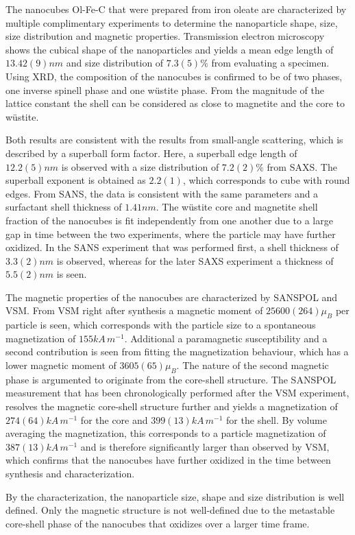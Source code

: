 \documentclass[\main/dresen_thesis.tex]{subfiles}
\begin{document}
  \label{sec:colloidalCrystals:nanoparticle:summary}
  The nanocubes Ol-Fe-C that were prepared from iron oleate are characterized by multiple complimentary experiments to determine the nanoparticle shape, size, size distribution and magnetic properties.
  Transmission electron microscopy shows the cubical shape of the nanoparticles and yields a mean edge length of $13.42(9) \unit{nm}$ and size distribution of $7.3(5) \%$ from evaluating a specimen.
  Using XRD, the composition of the nanocubes is confirmed to be of two phases, one inverse spinell phase and one w\"ustite phase.
  From the magnitude of the lattice constant the shell can be considered as close to magnetite and the core to w\"ustite.

  Both results are consistent with the results from small-angle scattering, which is described by a superball form factor.
  Here, a superball edge length of $12.2(5) \unit{nm}$ is observed with a size distribution of $7.2(2) \%$ from SAXS.
  The superball exponent is obtained as $2.2(1)$, which corresponds to cube with round edges.
  From SANS, the data is consistent with the same parameters and a surfactant shell thickness of $1.41 \unit{nm}$.
  The w\"ustite core and magnetite shell fraction of the nanocubes is fit independently from one another due to a large gap in time between the two experiments, where the particle may have further oxidized.
  In the SANS experiment that was performed first, a shell thickness of $3.3(2) \unit{nm}$ is observed, whereas for the later SAXS experiment a thickness of $5.5(2) \unit{nm}$ is seen.
  
  The magnetic properties of the nanocubes are characterized by SANSPOL and VSM.
  From VSM right after synthesis a magnetic moment of $25600(264) \mu_B$ per particle is seen, which corresponds with the particle size to a spontaneous magnetization of $155 \unit{kA \, m^{-1}}$.
  Additional a paramagnetic susceptibility and a second contribution is seen from fitting the magnetization behaviour, which has a lower magnetic moment of $3605(65) \mu_B$.
  The nature of the second magnetic phase is argumented to originate from the core-shell structure.
  The SANSPOL measurement that has been chronologically performed after the VSM experiment, resolves the magnetic core-shell structure further and yields a magnetization of $274(64) \unit{kA \, m^{-1}}$ for the core and $399(13) \unit{kA \, m^{-1}}$ for the shell.
  By volume averaging the magnetization, this corresponds to a particle magnetization of $387(13) \unit{kA \, m^{-1}}$ and is therefore significantly larger than observed by VSM, which confirms that the nanocubes have further oxidized in the time between synthesis and characterization.

  By the characterization, the nanoparticle size, shape and size distribution is well defined.
  Only the magnetic structure is not well-defined due to the metastable core-shell phase of the nanocubes that oxidizes over a larger time frame.
\end{document}

